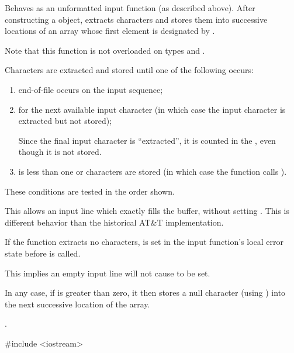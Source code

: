 \begin{itemdescr}
\pnum
\effects
Behaves as an unformatted input function
(as described above).
After constructing a  object, extracts
characters and stores them
into successive locations of an array whose first element is designated by
.
\begin{footnote}
Note that this function is not overloaded on types
and
.
\end{footnote}
Characters are extracted and stored until one of the following occurs:
\begin{enumerate}
\item
end-of-file occurs on the input sequence;
\item
{}
for the next available input
character 
(in which case the input character is extracted but not stored);
\begin{footnote}
Since
the final input character is ``extracted'',
it is counted in the
,
even though it is not stored.
\end{footnote}
\item
{} is less than one or 
characters are stored
(in which case the function calls
).
\end{enumerate}

\pnum
These conditions are tested in the order shown.
\begin{footnote}
This allows an input
line which exactly fills the buffer, without setting
.
This is different behavior than the historical AT\&T implementation.
\end{footnote}

\pnum
If the function extracts no characters,
 is set in the input function's local error state
before  is called.
\begin{footnote}
This implies an
empty input line will not cause
to be set.
\end{footnote}

\pnum
In any case, if  is greater than zero, it then stores a null character
(using
)
into the next successive location of the array.

\pnum
\returns
{}.

\pnum
\begin{example}
\begin{codeblock}
#include <iostream>


\end{codeblock}
\end{example}
\end{itemdescr}
